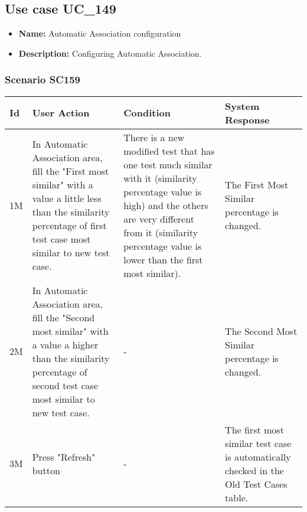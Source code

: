 \documentclass[a4paper,11pt]{article}
\newcommand{\bl}{\\ \hline}
\begin{document}
\subsection*{Use case UC_149}
\begin{itemize}
\item {\bf Name: }Automatic Association configuration
\item {\bf Description: }Configuring Automatic Association.
\end{itemize}
\subsubsection*{Scenario SC159}
\begin{tabular}{|p{0.4in}|p{1.5in}|p{1.5in}|p{1.5in}|}
\hline
Id & User Action & Condition & System Response \bl 
1M & In Automatic Association area, fill the "First most
						similar" with a value a little less than the similarity percentage
						of first test case most similar to new test case. & There is a new modified test that has one test much
						similar with it (similarity percentage value is high) and the
						others are very different from it (similarity percentage value is
						lower than the first most similar). & The First Most Similar percentage is changed.\bl
2M & In Automatic Association area, fill the "Second most
						similar" with a value a higher than the similarity percentage of
						second test case most similar to new test case. & - & The Second Most Similar percentage is changed.\bl
3M & Press "Refresh" button & - & The first most similar test case is automatically checked
						in the Old Test Cases table.\bl
\end{tabular}
\end{document}
